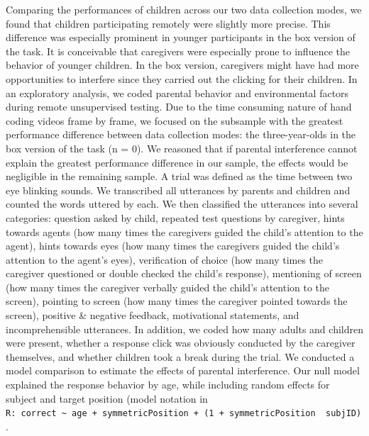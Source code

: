\documentclass[
  man,floatsintext]{apa6}
\begin{document}
Comparing the performances of children across our two data collection modes, we found that children participating remotely were slightly more precise.
This difference was especially prominent in younger participants in the box version of the task.
It is conceivable that caregivers were especially prone to influence the behavior of younger children.
In the box version, caregivers might have had more opportunities to interfere since they carried out the clicking for their children.
In an exploratory analysis, we coded parental behavior and environmental factors during remote unsupervised testing.
Due to the time consuming nature of hand coding videos frame by frame, we focused on the subsample with the greatest performance difference between data collection modes: the three-year-olds in the box version of the task (n = 0).
We reasoned that if parental interference cannot explain the greatest performance difference in our sample, the effects would be negligible in the remaining sample.
A trial was defined as the time between two eye blinking sounds.
We transcribed all utterances by parents and children and counted the words uttered by each.
We then classified the utterances into several categories: question asked by child, repeated test questions by caregiver, hints towards agents (how many times the caregivers guided the child's attention to the agent), hints towards eyes (how many times the caregivers guided the child's attention to the agent's eyes), verification of choice (how many times the caregiver questioned or double checked the child's response), mentioning of screen (how many times the caregiver verbally guided the child's attention to the screen), pointing to screen (how many times the caregiver pointed towards the screen), positive \& negative feedback, motivational statements, and incomprehensible utterances.
In addition, we coded how many adults and children were present, whether a response click was obviously conducted by the caregiver themselves, and whether children took a break during the trial.
We conducted a model comparison to estimate the effects of parental interference.
Our null model explained the response behavior by age, while including random effects for subject and target position (model notation in \texttt{R:\ correct\ \textasciitilde{}\ age\ +\ symmetricPosition\ +\ (1\ +\ symmetricPosition\ \textbar{}\ subjID)}.
\end{document}
